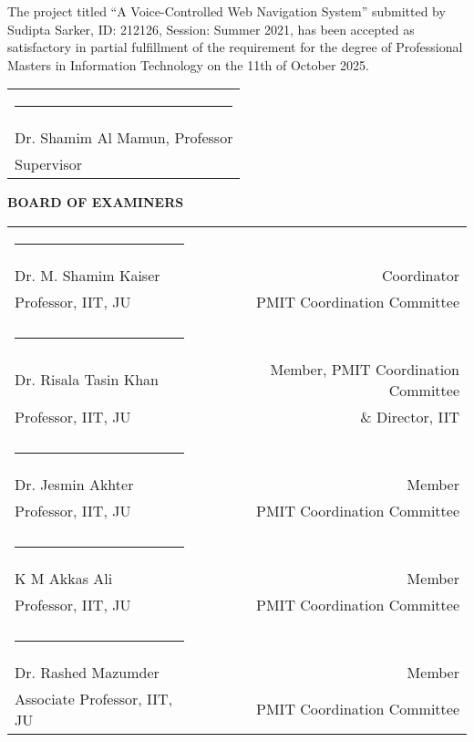 The project titled “A Voice-Controlled Web Navigation System” submitted by Sudipta Sarker, ID: 212126, Session: Summer 2021, has been accepted as satisfactory in partial fulfillment of the requirement for the degree of Professional Masters in Information Technology on the 11th of October 2025.


\bigskip
\bigskip
\bigskip

\noindent \begin{tabular}{l}

  \rule{4cm}{1pt} \\
  Dr. Shamim Al Mamun, Professor\\ %
  Supervisor\\

\end{tabular}




\begin{center}
   \textbf{BOARD OF EXAMINERS}
\end{center}
\noindent \begin{tabular}{lp{1cm}r}
\centering
  \rule{4cm}{1pt}&\\
     Dr. M. Shamim Kaiser  && Coordinator  \\
     Professor, IIT, JU  & & PMIT Coordination Committee  \\
     & &  \\
     \rule{4cm}{1pt}&\\
    Dr. Risala Tasin Khan  & &  Member, PMIT Coordination Committee   \\
     Professor, IIT, JU  & &\& Director, IIT\\
    & &  \\
     \rule{4cm}{1pt}&\\
     Dr. Jesmin Akhter & & Member  \\
      Professor, IIT, JU  & & PMIT Coordination Committee  \\
     &  \\
     \rule{4cm}{1pt}&\\
     K M Akkas Ali   & & Member  \\
      Professor, IIT, JU  & & PMIT Coordination Committee  \\
      &  \\
     \rule{4cm}{1pt}&\\
      Dr. Rashed Mazumder & &  Member  \\
      Associate Professor, IIT, JU  & & PMIT Coordination Committee  \\
     
   

\end{tabular}


